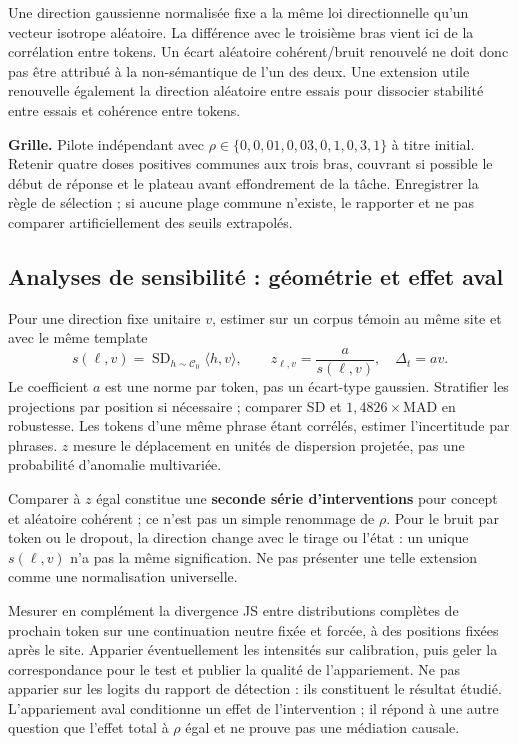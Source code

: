 \documentclass[10pt,a4paper]{article}
\begin{document}
Une direction gaussienne normalisée fixe a la même loi directionnelle qu'un vecteur isotrope aléatoire. La différence avec le troisième bras vient ici de la corrélation entre tokens. Un écart aléatoire cohérent/bruit renouvelé ne doit donc pas être attribué à la \og non-sémantique\fg{} de l'un des deux. Une extension utile renouvelle également la direction aléatoire entre essais pour dissocier stabilité entre essais et cohérence entre tokens.

\textbf{Grille.} Pilote indépendant avec $\rho\in\{0,0{,}01,0{,}03,0{,}1,0{,}3,1\}$ à titre initial. Retenir quatre doses positives communes aux trois bras, couvrant si possible le début de réponse et le plateau avant effondrement de la tâche. Enregistrer la règle de sélection ; si aucune plage commune n'existe, le rapporter et ne pas comparer artificiellement des seuils extrapolés.

\subsection{Analyses de sensibilité : géométrie et effet aval}
Pour une direction fixe unitaire $v$, estimer sur un corpus témoin au même site et avec le même template
\[
s(\ell,v)=\operatorname{SD}_{h\sim\mathcal C_0}\langle h,v\rangle,
\qquad z_{\ell,v}=\frac{a}{s(\ell,v)},\quad \Delta_t=a v.
\]
Le coefficient $a$ est une norme par token, pas un écart-type gaussien. Stratifier les projections par position si nécessaire ; comparer SD et $1{,}4826\times\mathrm{MAD}$ en robustesse. Les tokens d'une même phrase étant corrélés, estimer l'incertitude par phrases. $z$ mesure le déplacement en unités de dispersion projetée, pas une probabilité d'anomalie multivariée.

Comparer à $z$ égal constitue une \textbf{seconde série d'interventions} pour concept et aléatoire cohérent ; ce n'est pas un simple renommage de $\rho$. Pour le bruit par token ou le dropout, la direction change avec le tirage ou l'état : un unique $s(\ell,v)$ n'a pas la même signification. Ne pas présenter une telle extension comme une normalisation universelle.

Mesurer en complément la divergence JS entre distributions complètes de prochain token sur une continuation neutre fixée et forcée, à des positions fixées après le site. Apparier éventuellement les intensités sur calibration, puis geler la correspondance pour le test et publier la qualité de l'appariement. Ne pas apparier sur les logits du rapport de détection : ils constituent le résultat étudié. L'appariement aval conditionne un effet de l'intervention ; il répond à une autre question que l'effet total à $\rho$ égal et ne prouve pas une médiation causale.
\end{document}
